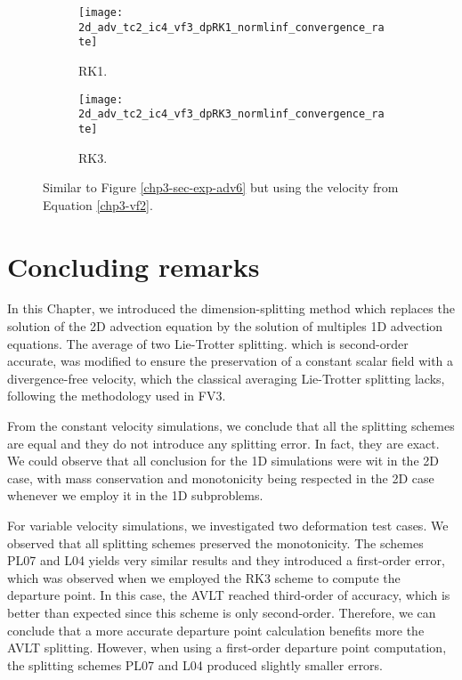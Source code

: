 \begin{figure}[!htb]
	\centering
	\begin{subfigure}{0.45\textwidth}
		\centering
		\texttt{[image: 2d\_adv\_tc2\_ic4\_vf3\_dpRK1\_normlinf\_convergence\_rate]}
		\caption{RK1.\label{chp3-sec-exp-adv8-error1}}
	\end{subfigure}
	\begin{subfigure}{0.45\textwidth}
		\centering
		\texttt{[image: 2d\_adv\_tc2\_ic4\_vf3\_dpRK3\_normlinf\_convergence\_rate]}
		\caption{RK3.\label{chp3-sec-exp-adv8-error2}}
	\end{subfigure}
	\caption{Similar to Figure \ref{chp3-sec-exp-adv6} but using the velocity from Equation   \eqref{chp3-vf2}.\label{chp3-sec-exp-adv8}}
\end{figure}

\break
\section{Concluding remarks}
In this Chapter, we introduced the dimension-splitting method which replaces the solution
of the 2D advection equation by the solution of multiples 1D advection equations.
The average of two Lie-Trotter splitting. which is second-order accurate, was modified to ensure the preservation of a constant scalar field
with a divergence-free velocity, which the classical averaging Lie-Trotter splitting lacks, following
the methodology used in FV3.

From the constant velocity simulations, we conclude that all the splitting schemes are equal 
and they do not introduce any splitting error. In fact, they are exact. We could observe
that all conclusion for the 1D simulations were wit in the 2D case, with mass conservation
and monotonicity  being respected in the 2D case whenever we employ it in the 1D subproblems.

For variable velocity simulations, we investigated two deformation test cases.
We observed that all splitting schemes preserved the monotonicity.
The schemes PL07 and L04 yields very similar results and they introduced a first-order error,
which was observed when we employed the RK3 scheme to compute the departure point.
In this case, the AVLT reached third-order of accuracy, which is better than expected since this scheme
is only second-order. Therefore, we can conclude that a more accurate departure point calculation
benefits more the AVLT splitting. However, when using a first-order departure point computation, the splitting schemes
PL07 and L04 produced slightly smaller errors.